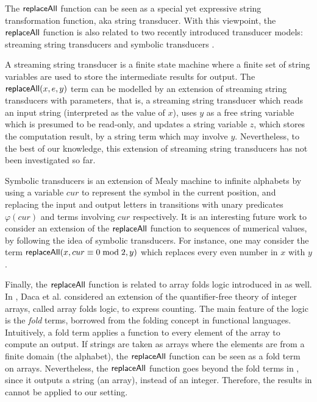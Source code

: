 


The $\mathsf{replaceAll}$ function can be seen as a special yet expressive string transformation function, aka string transducer. With this viewpoint, 
the $\mathsf{replaceAll}$ function is also related to two recently introduced transducer models: streaming string transducers \cite{AC10} and symbolic transducers \cite{symbolic-transducer}. 

A streaming string transducer is a finite state machine where  a finite set of string variables are used to store the intermediate results for output. The $\mathsf{replaceAll}(x, e, y)$ term can be modelled by an extension of streaming string transducers with parameters, that is, a streaming string transducer which reads an input string (interpreted as the value of $x$), uses $y$ as a free string variable which is presumed to be read-only, and updates a string variable $z$, which stores the computation result, by a string term which may involve $y$. Nevertheless, to the best of our knowledge, this extension of streaming string transducers has not been investigated so far. 

Symbolic transducers is an extension of Mealy machine to infinite alphabets by using a variable $cur$ to represent the symbol in the current position, and replacing the input and output letters in transitions with unary predicates $\varphi(cur)$ and terms involving $cur$ respectively. It is an interesting future work to consider an extension of the $\mathsf{replaceAll}$ function to sequences of numerical values, by following the idea of symbolic transducers. For instance, one may consider the term $\mathsf{replaceAll}(x, cur \equiv 0 \bmod 2, y)$ which replaces every even number in $x$ with $y$.

Finally, the $\mathsf{replaceAll}$ function is related to array folds logic introduced in \cite{DHK16} as well. In \cite{DHK16}, Daca et al. considered an extension of the quantifier-free theory of integer arrays, called array folds logic, to express counting. The main feature of the logic is the \emph{fold} terms, borrowed from the folding concept in functional languages. Intuitively, a fold term applies a function to every element of the array to compute an output. If strings are taken as arrays where the elements are from a finite domain (the alphabet), the $\mathsf{replaceAll}$ function can be seen as a fold term on arrays. Nevertheless, the $\mathsf{replaceAll}$ function goes beyond the fold terms in \cite{DHK16}, since it outputs a string (an array), instead of an integer. Therefore, the results in \cite{DHK16} cannot be applied to our setting.

